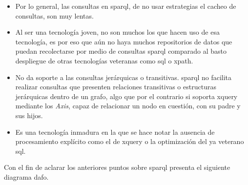 \begin{itemize}
	\item Por lo general, las consultas en \acrshort{sparql}, de no usar estrategias el cacheo de consultas\cite{SPARQL_Performance}, son muy lentas.

	\item Al ser una tecnología joven, no son muchos los que hacen uso de esa tecnología, es por eso que aún no haya muchos repositorios de datos que puedan recolectarse por medio de consultas \acrshort{sparql} comparado al basto despliegue de otras tecnologías veteranas como \acrshort{sql} o \acrshort{xpath}\cite{XPath}.

	\item No da soporte a las consultas jerárquicas o transitivas. \acrshort{sparql} no facilita realizar consultas que presenten relaciones transitivas o estructuras jerárquicas dentro de un grafo, algo que por el contrario si soporta \acrshort{xquery} mediante los \textit{Axis}, capaz de relacionar un nodo en cuestión, con su padre y sus hijos\cite{XQueryAxes}.

	\item Es una tecnología inmadura en la que se hace notar la ausencia de procesamiento explícito como el de \acrshort{xquery} o la optimización del ya veterano \acrshort{sql}.
\end{itemize}

Con el fin de aclarar los anteriores puntos sobre \acrshort{sparql} presenta el siguiente diagrama \acrfull{dafo}.

